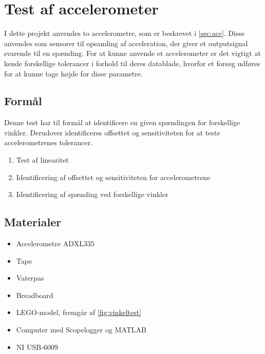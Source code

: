 \section{Test af accelerometer} 
\label{sec:test_acc}
I dette projekt anvendes to accelerometre, som er beskrevet i \autoref{sec:acc}. Disse anvendes som sensorer til opsamling af acceleration, der giver et outputsignal svarende til en spænding. For at kunne anvende et accelerometer er det vigtigt at kende forskellige tolerancer i forhold til deres datablade, hvorfor et forsøg udføres for at kunne tage højde for disse parametre.

\subsection{Formål}\label{sec:acc_formaal}
Denne test har til formål at identificere en given spændingen for forskellige vinkler. Derudover identificeres %
offsettet og sensitiviteten for at teste accelerometrenes tolerancer.

\begin{enumerate}
\item Test af linearitet
\item Identificering af offsettet og sensitiviteten for accelerometrene
\item Identificering af spænding ved forskellige vinkler
\end{enumerate}

\subsection{Materialer}
\begin{itemize}
\item Accelerometre ADXL$335$
\item Tape
\item Vaterpas
\item Breadboard
\item LEGO-model, fremgår af \autoref{fig:vinkeltest}
\item Computer med Scopelogger og MATLAB
\item NI USB-6009
\end{itemize}

